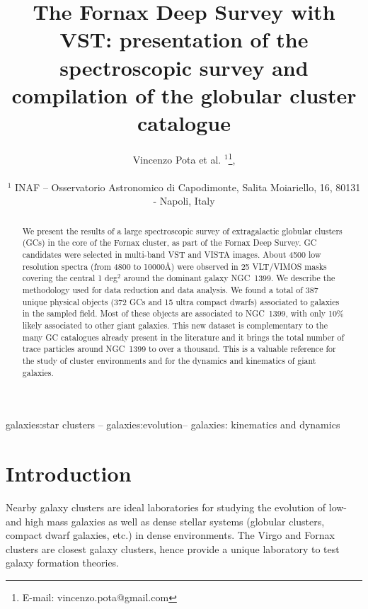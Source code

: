 \documentclass[useAMS,usenatbib]{mn2e}
\title[The Fornax Deep survey]{The Fornax Deep Survey with VST: presentation of the spectroscopic survey and compilation of the globular cluster catalogue}
\author[Pota et al.]{\noindent
Vincenzo Pota et al. $^{1}$\thanks{E-mail: vincenzo.pota@gmail.com}, 
\\~\\
$^1$ INAF -- Osservatorio Astronomico di Capodimonte, Salita Moiariello, 16, 80131 - Napoli, Italy\\
}
\begin{document}
\label{firstpage}

\maketitle
\begin{abstract}
We present the results of a large spectroscopic survey of extragalactic globular clusters (GCs) in the core of the Fornax cluster, as part of the Fornax Deep Survey. GC candidates were selected in multi-band VST and VISTA images. About 4500 low resolution spectra (from 4800 to 10000\AA) were observed in 25 VLT/VIMOS masks covering the central 1 deg$^2$ around the dominant galaxy NGC~1399. We describe the methodology used for data reduction and data analysis. We found a total of 387 unique physical objects (372 GCs and 15 ultra compact dwarfs) associated to galaxies in the sampled field. Most of these objects are associated to NGC~1399, with only 10\% likely associated to other giant galaxies. This new dataset is complementary to the many GC catalogues already present in the literature and it brings the total number of trace particles around  NGC~1399 to over a thousand. This is a valuable reference for the study of cluster environments and for the dynamics and kinematics of giant galaxies. 

\end{abstract}

\begin{keywords}
galaxies:star clusters -- galaxies:evolution-- galaxies: kinematics and dynamics
\end{keywords}

\section{Introduction}

Nearby galaxy clusters are ideal laboratories for studying the evolution of low- and high mass galaxies as well as dense stellar systems (globular clusters, compact dwarf galaxies, etc.) in dense environments. The Virgo and Fornax clusters are closest galaxy clusters, hence provide a unique laboratory to test galaxy formation theories. 
\end{document}
